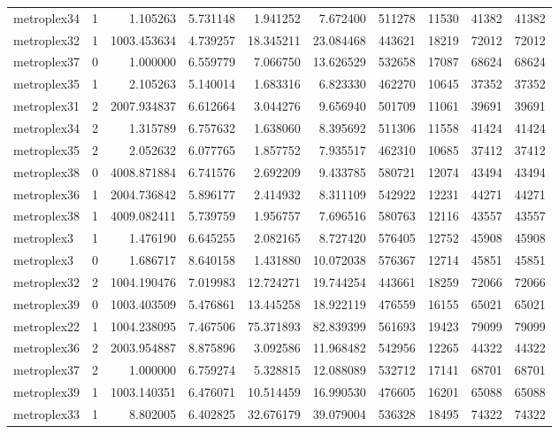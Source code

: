 \begin{longtable}{|l|r|r|r|r|r|r|r|r|r|}
metroplex34 & 1 & 1.105263 & 5.731148 & 1.941252 & 7.672400 & 511278 & 11530 & 41382 & 41382 \\
metroplex32 & 1 & 1003.453634 & 4.739257 & 18.345211 & 23.084468 & 443621 & 18219 & 72012 & 72012 \\
metroplex37 & 0 & 1.000000 & 6.559779 & 7.066750 & 13.626529 & 532658 & 17087 & 68624 & 68624 \\
metroplex35 & 1 & 2.105263 & 5.140014 & 1.683316 & 6.823330 & 462270 & 10645 & 37352 & 37352 \\
metroplex31 & 2 & 2007.934837 & 6.612664 & 3.044276 & 9.656940 & 501709 & 11061 & 39691 & 39691 \\
metroplex34 & 2 & 1.315789 & 6.757632 & 1.638060 & 8.395692 & 511306 & 11558 & 41424 & 41424 \\
metroplex35 & 2 & 2.052632 & 6.077765 & 1.857752 & 7.935517 & 462310 & 10685 & 37412 & 37412 \\
metroplex38 & 0 & 4008.871884 & 6.741576 & 2.692209 & 9.433785 & 580721 & 12074 & 43494 & 43494 \\
metroplex36 & 1 & 2004.736842 & 5.896177 & 2.414932 & 8.311109 & 542922 & 12231 & 44271 & 44271 \\
metroplex38 & 1 & 4009.082411 & 5.739759 & 1.956757 & 7.696516 & 580763 & 12116 & 43557 & 43557 \\
metroplex3 & 1 & 1.476190 & 6.645255 & 2.082165 & 8.727420 & 576405 & 12752 & 45908 & 45908 \\
metroplex3 & 0 & 1.686717 & 8.640158 & 1.431880 & 10.072038 & 576367 & 12714 & 45851 & 45851 \\
metroplex32 & 2 & 1004.190476 & 7.019983 & 12.724271 & 19.744254 & 443661 & 18259 & 72066 & 72066 \\
metroplex39 & 0 & 1003.403509 & 5.476861 & 13.445258 & 18.922119 & 476559 & 16155 & 65021 & 65021 \\
metroplex22 & 1 & 1004.238095 & 7.467506 & 75.371893 & 82.839399 & 561693 & 19423 & 79099 & 79099 \\
metroplex36 & 2 & 2003.954887 & 8.875896 & 3.092586 & 11.968482 & 542956 & 12265 & 44322 & 44322 \\
metroplex37 & 2 & 1.000000 & 6.759274 & 5.328815 & 12.088089 & 532712 & 17141 & 68701 & 68701 \\
metroplex39 & 1 & 1003.140351 & 6.476071 & 10.514459 & 16.990530 & 476605 & 16201 & 65088 & 65088 \\
metroplex33 & 1 & 8.802005 & 6.402825 & 32.676179 & 39.079004 & 536328 & 18495 & 74322 & 74322 \\

\end{longtable}

